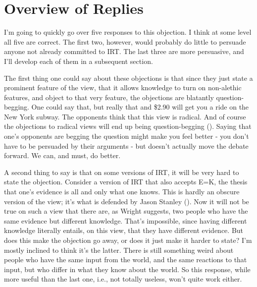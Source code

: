 \documentclass[
  10pt,
  letterpaper,
  twoside]{scrbook}
\begin{document}
\section{Overview of Replies}\label{sec-overview}

I'm going to quickly go over five responses to this objection. I think
at some level all five are correct. The first two, however, would
probably do little to persuade anyone not already committed to IRT. The
last three are more persuasive, and I'll develop each of them in a
subsequent section.

The first thing one could say about these objections is that since they
just state a prominent feature of the view, that it allows knowledge to
turn on non-alethic features, and object to that very feature, the
objections are blatantly question-begging. One could say that, but
really that and \$2.90 will get you a ride on the New York subway. The
opponents think that this view is radical. And of course the objections
to radical views will end up being question-begging
(). Saying that one's opponents
are begging the question might make you feel better - you don't have to
be persuaded by their arguments - but doesn't actually move the debate
forward. We can, and must, do better.

A second thing to say is that on some versions of IRT, it will be very
hard to state the objection. Consider a version of IRT that also accepts
E=K, the thesis that one's evidence is all and only what one knows. This
is hardly an obscure version of the view; it's what is defended by Jason
Stanley (). Now it will not be true on
such a view that there are, as Wright suggests, two people who have the
same evidence but different knowledge. That's impossible, since having
different knowledge literally entails, on this view, that they have
different evidence. But does this make the objection go away, or does it
just make it harder to state? I'm mostly inclined to think it's the
latter. There is still something weird about people who have the same
input from the world, and the same reactions to that input, but who
differ in what they know about the world. So this response, while more
useful than the last one, i.e., not totally useless, won't quite work
either.
\end{document}
